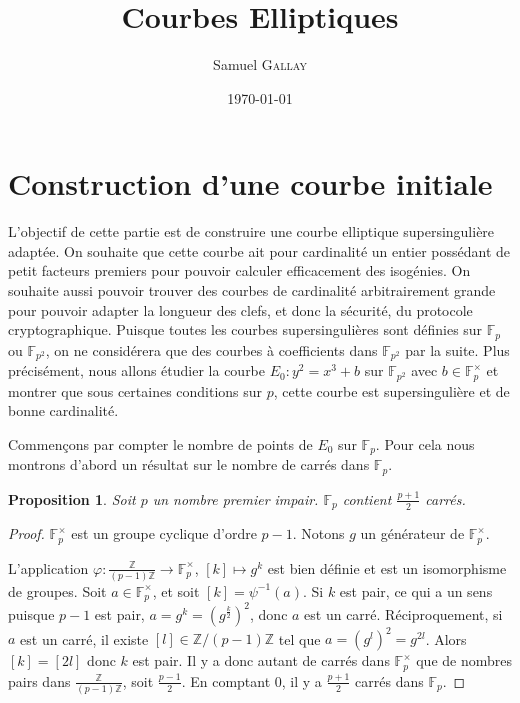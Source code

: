 \documentclass{article}
\title{Courbes Elliptiques}
\author{Samuel \textsc{Gallay}}
\date{\today}
\newtheorem{prop}{Proposition}
\newcommand{\Fp}{\mathbb{F}_{p}}
\newcommand{\Fq}{\mathbb{F}_{p^2}}
\newcommand{\Z}{\mathbb{Z}}
\begin{document}
\maketitle



\section{Construction d'une courbe initiale}

L'objectif de cette partie est de construire une courbe elliptique supersingulière adaptée. 
On souhaite que cette courbe ait pour cardinalité un entier possédant de petit facteurs premiers pour pouvoir calculer efficacement des isogénies. 
On souhaite aussi pouvoir trouver des courbes de cardinalité arbitrairement grande pour pouvoir adapter la longueur des clefs, et donc la sécurité, du protocole cryptographique.
Puisque toutes les courbes supersingulières sont définies sur $\Fp$ ou $\Fq$, on ne considérera que des courbes à coefficients dans $\Fq$ par la suite.
Plus précisément, nous allons étudier la courbe $E_0 : y^2 = x^3 + b$ sur $\Fq$ avec $b\in\Fp^\times$ et montrer que sous certaines conditions sur $p$, cette courbe est supersingulière et de bonne cardinalité.


Commençons par compter le nombre de points de $E_0$ sur $\Fp$. Pour cela nous montrons d'abord un résultat sur le nombre de carrés dans $\Fp$.

\begin{prop}
  Soit $p$ un nombre premier impair. $\Fp$ contient $\frac{p+1}{2}$ carrés.
\end{prop}

\begin{proof}
  $\Fp^\times$ est un groupe cyclique d'ordre $p-1$. 
  Notons $g$ un générateur de $\Fp^\times$. 
  
  L'application $ \varphi \colon \frac{\Z}{(p-1)\Z} \to \Fp^\times$,
  $[k] \mapsto g^k$
  est bien définie et est un isomorphisme de groupes.
  Soit $a\in \Fp^\times$, et soit $[k] = \psi^{-1}(a)$.
  Si $k$ est pair, ce qui a un sens puisque $p-1$ est pair, $a = g^k = (g^\frac{k}{2})^2$, donc $a$ est un carré.
  Réciproquement, si $a$ est un carré, il existe $[l]\in \Z/(p-1)\Z$ tel que $a = (g^l)^2 = g^{2l}$.
  Alors $[k] = [2l]$ donc $k$ est pair.
  Il y a donc autant de carrés dans $\Fp^\times$ que de nombres pairs dans $\frac{\Z}{(p-1)\Z}$, soit $\frac{p-1}{2}$. 
  En comptant $0$, il y a $\frac{p+1}{2}$ carrés dans $\Fp$. 
\end{proof}
\end{document}
